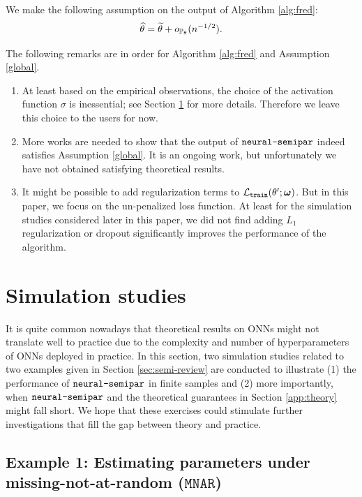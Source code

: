 \documentclass[11pt]{article}
\def\MNAR{\texttt{MNAR}}
\def\neurosemi{{\normalfont\texttt{neural-semipar}}}
\def\train{\texttt{train}}
\begin{document}
\begin{assumption}
\label{global}
We make the following assumption on the output of Algorithm \ref{alg:fred}:
\begin{equation}
\widehat{\theta} = \widetilde{\theta} + o_{{\mathbb{P}}_{\theta}} (n^{- 1 / 2}).
\end{equation}
\end{assumption}

\noindent The following remarks are in order for Algorithm \ref{alg:fred} and Assumption \ref{global}.
\begin{remark}\leavevmode
\begin{enumerate}[label = (\arabic*)]
\item At least based on the empirical observations, the choice of the activation function $\sigma$ is inessential; see Section \ref{sec:sim} for more details. Therefore we leave this choice to the users for now.
\item More works are needed to show that the output of $\neurosemi$ indeed satisfies Assumption \ref{global}. It is an ongoing work, but unfortunately we have not obtained satisfying theoretical results.
\item It might be possible to add regularization terms to $\calL_{\train} (\theta'; \bm{\omega})$. But in this paper, we focus on the un-penalized loss function. At least for the simulation studies considered later in this paper, we did not find adding $L_{1}$ regularization or dropout significantly improves the performance of the algorithm.
\end{enumerate}
\end{remark}

\section{Simulation studies}
\label{sec:sim}

It is quite common nowadays that theoretical results on ONNs might not translate well to practice due to the complexity and number of hyperparameters of ONNs deployed in practice. In this section, two simulation studies related to two examples given in Section \ref{sec:semi-review} are conducted to illustrate (1) the performance of $\neurosemi$ in finite samples and (2) more importantly, when $\neurosemi$ and the theoretical guarantees in Section \ref{app:theory} might fall short. We hope that these exercises could stimulate further investigations that fill the gap between theory and practice.

\subsection{Example 1: Estimating parameters under missing-not-at-random ($\MNAR$)}
\label{sec:mnar}
\end{document}
